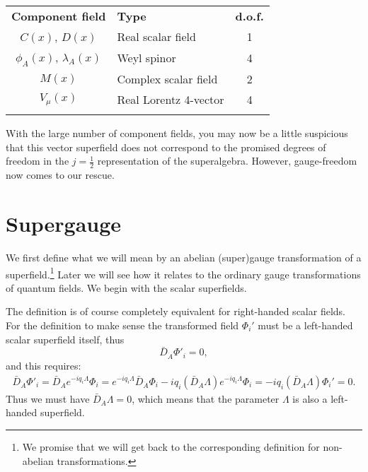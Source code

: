 \documentclass[notes.tex]{subfiles}
\begin{document}
\begin{center}
   \begin{tabular}{c |l| c} 
   \noalign{\smallskip}\hline\noalign{\smallskip}
   {\bf Component field} & {\bf Type} & {\bf d.o.f.} \\
   \noalign{\smallskip}\hline\noalign{\smallskip}
   $C(x)$, $D(x)$ & Real scalar field& 1\\
  $\phi_A(x)$, $\lambda_A(x)$ &Weyl spinor & 4\\
  $M(x)$ &Complex scalar field & 2\\
  $V_\mu(x)$ & Real Lorentz 4-vector & 4\\
  \noalign{\smallskip}\hline\noalign{\smallskip}
    \end{tabular}
   \end{center}

With the large number of component fields, you may now be a little suspicious that this vector superfield does not correspond to the promised degrees of freedom in the $j=\frac{1}{2}$ representation of the superalgebra. However, gauge-freedom now comes to our rescue.



\section{Supergauge}
We first define what we will mean by an abelian (super)gauge transformation of a superfield.\footnote{We promise that we will get back to the corresponding definition for non-abelian transformations.} Later we will see how it relates to the ordinary gauge transformations of quantum fields. We begin with the scalar superfields.

The definition is of course completely equivalent for right-handed scalar fields. For the definition to make sense the transformed field $\Phi_i'$ must be a left-handed scalar superfield itself, thus
\[\bar{D}_{\dot{A}}\Phi'_i = 0,\]
and this requires:
\begin{eqnarray*}
\bar{D}_{\dot{A}}\Phi'_i = \bar{D}_{\dot{A}}e^{-iq_i\Lambda }\Phi_i =  e^{-iq_i\Lambda }\bar{D}_{\dot{A}}\Phi_i -iq_i(\bar{D}_{\dot{A}}\Lambda)e^{-i q_i\Lambda}\Phi_i
= -iq_i(\bar{D}_{\dot{A}}\Lambda)\Phi_i'=0.
\end{eqnarray*}
Thus we must have $\bar{D}_{\dot{A}}\Lambda = 0$, which means that  the parameter $\Lambda$ is also a left-handed superfield. 
\end{document}

